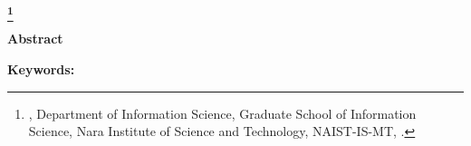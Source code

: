 \newpage
\begin{center}
 \renewcommand{\thefootnote}{\fnsymbol{footnote}}
 \Large\bfseries \etitle\footnote[1]
 {{\edoctitle}, Department of Information Science,
 Graduate School of Information \mbox{Science,}
 Nara Institute of Science and Technology,
 {NAIST-IS-MT\studentnumber}, \edate.}
 \renewcommand{\thefootnote}{\arabic{footnote}}
\end{center}
\vspace*{1truemm}
\begin{center}
 \large\eauthor
\end{center}
\vspace*{2truemm}
\begin{center}
 {\bfseries Abstract}
\end{center}
\vspace*{2truemm}
\par
\eabstract
\begin{flushleft}
 {\bfseries Keywords:}
\end{flushleft}\ekeywords
